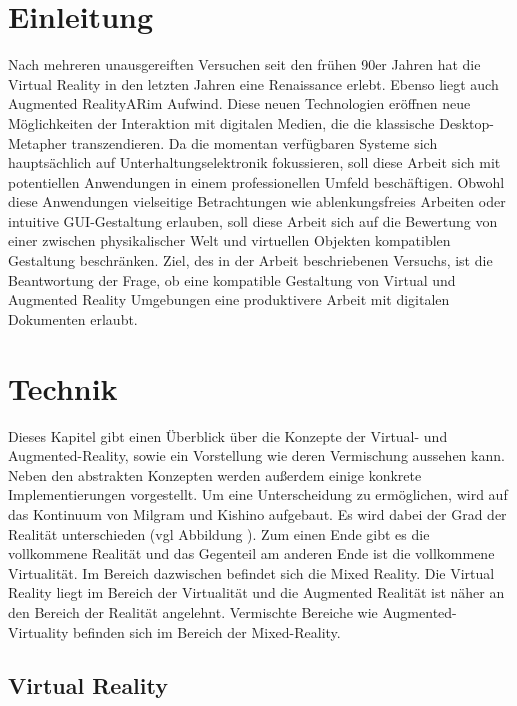 \documentclass[12pt,a4paper,bibliography=totocnumbered,listof=totocnumbered]{scrartcl}
\begin{document}
\section{Einleitung}
Nach mehreren unausgereiften Versuchen seit den frühen 90er Jahren hat die Virtual Reality in den letzten Jahren eine Renaissance erlebt. Ebenso liegt auch Augmented Reality\ac{AR}im Aufwind. Diese neuen Technologien eröffnen neue Möglichkeiten der Interaktion mit digitalen Medien, die die klassische Desktop-Metapher transzendieren. Da die momentan verfügbaren Systeme sich hauptsächlich auf Unterhaltungselektronik fokussieren, soll diese Arbeit sich mit potentiellen Anwendungen in einem professionellen Umfeld beschäftigen. Obwohl diese Anwendungen vielseitige Betrachtungen wie ablenkungsfreies Arbeiten oder intuitive GUI-Gestaltung erlauben, soll diese Arbeit sich auf die Bewertung von einer zwischen physikalischer Welt und virtuellen Objekten kompatiblen Gestaltung beschränken. Ziel, des in der Arbeit beschriebenen Versuchs, ist die Beantwortung der Frage, ob eine kompatible Gestaltung von Virtual und Augmented Reality Umgebungen eine produktivere Arbeit mit digitalen Dokumenten erlaubt.
\section{Technik}
Dieses Kapitel gibt einen Überblick über die Konzepte der Virtual- und Augmented-Reality, sowie ein Vorstellung wie deren Vermischung aussehen kann. Neben den abstrakten Konzepten werden außerdem einige konkrete Implementierungen vorgestellt. Um eine Unterscheidung zu ermöglichen, wird auf das Kontinuum von Milgram und Kishino aufgebaut. Es wird dabei der Grad der Realität unterschieden (vgl Abbildung %
). Zum einen Ende gibt es die vollkommene Realität und das Gegenteil am anderen Ende ist die vollkommene Virtualität. Im Bereich dazwischen befindet sich die Mixed Reality. Die Virtual Reality liegt im Bereich der Virtualität und die Augmented Realität ist näher an den Bereich der Realität angelehnt. Vermischte Bereiche wie Augmented-Virtuality befinden sich im Bereich der Mixed-Reality.
\subsection{Virtual Reality}
\end{document}
